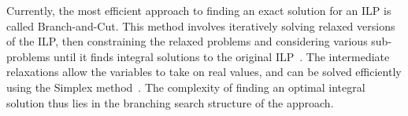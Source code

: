 Currently, the most efficient approach to finding an exact solution for 
an ILP is called Branch-and-Cut. This method involves iteratively solving 
relaxed versions of the ILP, then constraining the relaxed problems and
considering various sub-problems until it finds integral solutions to the 
original ILP~\cite{mitchell_branch-and-cut_2002}.
The intermediate relaxations allow the variables to take on real values, 
and can be solved efficiently using the Simplex method~\cite{shamir_efficiency_1987}. The 
complexity of finding an optimal integral solution thus lies in the 
branching search structure of the approach.



